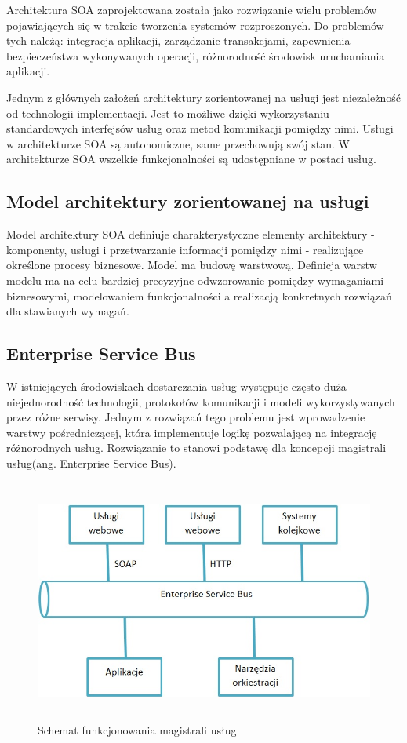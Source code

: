 	Architektura SOA zaprojektowana została jako rozwiązanie wielu problemów pojawiających się w trakcie tworzenia systemów rozproszonych. Do problemów tych należą: integracja aplikacji, zarządzanie transakcjami, zapewnienia bezpieczeństwa wykonywanych operacji, różnorodność środowisk uruchamiania aplikacji\cite{Papazoglou07}.

	Jednym z głównych założeń architektury zorientowanej na usługi jest niezależność od technologii implementacji. Jest to możliwe dzięki wykorzystaniu standardowych interfejsów usług oraz metod komunikacji pomiędzy nimi. Usługi w architekturze SOA są autonomiczne, same przechowują swój stan. W architekturze SOA wszelkie funkcjonalności są udostępniane w postaci usług.
	
	\subsection{Model architektury zorientowanej na usługi}
	
		Model architektury SOA definiuje charakterystyczne elementy architektury - komponenty, usługi i przetwarzanie informacji pomiędzy nimi - realizujące określone procesy biznesowe. Model ma budowę warstwową. Definicja warstw modelu ma na celu bardziej precyzyjne odwzorowanie pomiędzy wymaganiami biznesowymi, modelowaniem funkcjonalności a realizacją konkretnych rozwiązań dla stawianych wymagań.   	

	\subsection{Enterprise Service Bus} 

		W istniejących środowiskach dostarczania usług występuje często duża niejednorodność technologii, protokołów komunikacji i modeli wykorzystywanych przez różne serwisy. Jednym z rozwiązań tego problemu jest wprowadzenie warstwy pośredniczącej, która implementuje logikę pozwalającą na integrację różnorodnych usług. Rozwiązanie to stanowi podstawę dla koncepcji magistrali usług(ang. Enterprise Service Bus). 

		\begin{figure}[h]
			\centering
			\includegraphics[width=15cm,height=8cm]{img/esb.jpg}
			\caption{Schemat funkcjonowania magistrali usług}
			\label{Schemat funkcjonowania magistrali uslug}
		\end{figure}

